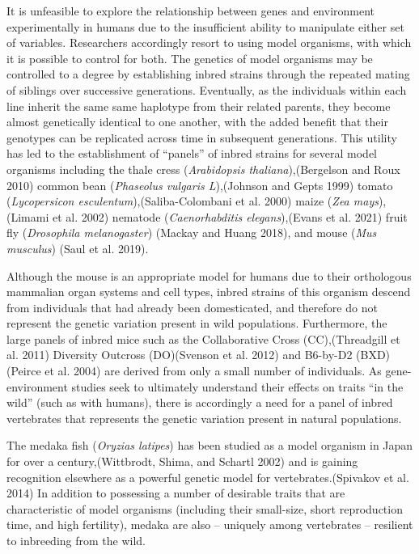 \documentclass[
]{book}
\begin{document}
It is unfeasible to explore the relationship between genes and environment experimentally in humans due to the insufficient ability to manipulate either set of variables. Researchers accordingly resort to using model organisms, with which it is possible to control for both. The genetics of model organisms may be controlled to a degree by establishing inbred strains through the repeated mating of siblings over successive generations. Eventually, as the individuals within each line inherit the same same haplotype from their related parents, they become almost genetically identical to one another, with the added benefit that their genotypes can be replicated across time in subsequent generations. This utility has led to the establishment of ``panels'' of inbred strains for several model organisms including the thale cress (\emph{Arabidopsis thaliana}),(Bergelson and Roux 2010) common bean (\emph{Phaseolus vulgaris L}),(Johnson and Gepts 1999) tomato (\emph{Lycopersicon esculentum}),(Saliba-Colombani et al. 2000) maize (\emph{Zea mays}),(Limami et al. 2002) nematode (\emph{Caenorhabditis elegans}),(Evans et al. 2021) fruit fly (\emph{Drosophila melanogaster}) (Mackay and Huang 2018), and mouse (\emph{Mus musculus}) (Saul et al. 2019).

Although the mouse is an appropriate model for humans due to their orthologous mammalian organ systems and cell types, inbred strains of this organism descend from individuals that had already been domesticated, and therefore do not represent the genetic variation present in wild populations. Furthermore, the large panels of inbred mice such as the Collaborative Cross (CC),(Threadgill et al. 2011) Diversity Outcross (DO)(Svenson et al. 2012) and B6-by-D2 (BXD)(Peirce et al. 2004) are derived from only a small number of individuals. As gene-environment studies seek to ultimately understand their effects on traits ``in the wild'' (such as with humans), there is accordingly a need for a panel of inbred vertebrates that represents the genetic variation present in natural populations.

The medaka fish (\emph{Oryzias latipes}) has been studied as a model organism in Japan for over a century,(Wittbrodt, Shima, and Schartl 2002) and is gaining recognition elsewhere as a powerful genetic model for vertebrates.(Spivakov et al. 2014) In addition to possessing a number of desirable traits that are characteristic of model organisms (including their small-size, short reproduction time, and high fertility), medaka are also -- uniquely among vertebrates -- resilient to inbreeding from the wild.
\end{document}
